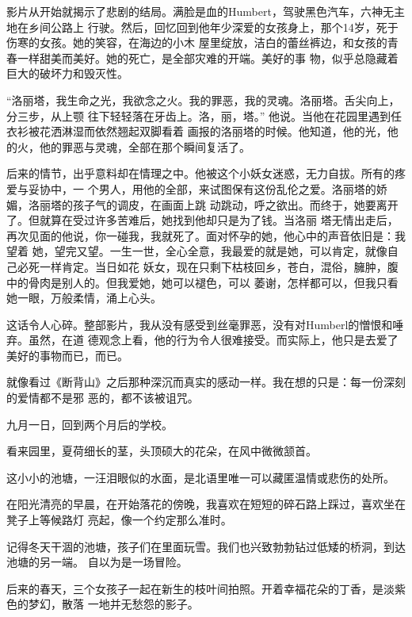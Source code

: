 		影片从开始就揭示了悲剧的结局。满脸是血的Humbert，驾驶黑色汽车，六神无主地在乡间公路上
	行驶。然后，回忆回到他年少深爱的女孩身上，那个14岁，死于伤寒的女孩。她的笑容，在海边的小木
	屋里绽放，洁白的蕾丝裤边，和女孩的青春一样甜美而美好。她的死亡，是全部灾难的开端。美好的事
	物，似乎总隐藏着巨大的破坏力和毁灭性。

		“洛丽塔，我生命之光，我欲念之火。我的罪恶，我的灵魂。洛丽塔。舌尖向上，分三步，从上颚
	往下轻轻落在牙齿上。洛，丽，塔。” 他说。当他在花园里遇到任衣衫被花洒淋湿而依然翘起双脚看着
	画报的洛丽塔的时候。他知道，他的光，他的火，他的罪恶与灵魂，全部在那个瞬间复活了。

		后来的情节，出乎意料却在情理之中。他被这个小妖女迷惑，无力自拔。所有的疼爱与妥协中，一
	个男人，用他的全部，来试图保有这份乱伦之爱。洛丽塔的娇媚，洛丽塔的孩子气的调皮，在画面上跳
	动跳动，呼之欲出。而终于，她要离开了。但就算在受过许多苦难后，她找到他却只是为了钱。当洛丽
	塔无情出走后，再次见面的他说，你一碰我，我就死了。面对怀孕的她，他心中的声音依旧是：我望着
	她，望完又望。一生一世，全心全意，我最爱的就是她，可以肯定，就像自己必死一样肯定。当日如花
	妖女，现在只剩下枯枝回乡，苍白，混俗，臃肿，腹中的骨肉是别人的。但我爱她，她可以褪色，可以
	萎谢，怎样都可以，但我只看她一眼，万般柔情，涌上心头。

		这话令人心碎。整部影片，我从没有感受到丝毫罪恶，没有对Humberl的憎恨和唾弃。虽然，在道
	德观念上看，他的行为令人很难接受。而实际上，他只是去爱了美好的事物而已，而已。

		就像看过《断背山》之后那种深沉而真实的感动一样。我在想的只是：每一份深刻的爱情都不是邪
	恶的，都不该被诅咒。

	\endwriting




		九月一日，回到两个月后的学校。

		看来园里，夏荷细长的茎，头顶硕大的花朵，在风中微微颔首。

		这小小的池塘，一汪泪眼似的水面，是北语里唯一可以藏匿温情或悲伤的处所。

		在阳光清亮的早晨，在开始落花的傍晚，我喜欢在短短的碎石路上踩过，喜欢坐在凳子上等候路灯
	亮起，像一个约定那么准时。

		记得冬天干涸的池塘，孩子们在里面玩雪。我们也兴致勃勃钻过低矮的桥洞，到达池塘的另一端。
	自以为是一场冒险。

		后来的春天，三个女孩子一起在新生的枝叶间拍照。开着幸福花朵的丁香，是淡紫色的梦幻，散落
	一地并无愁怨的影子。

